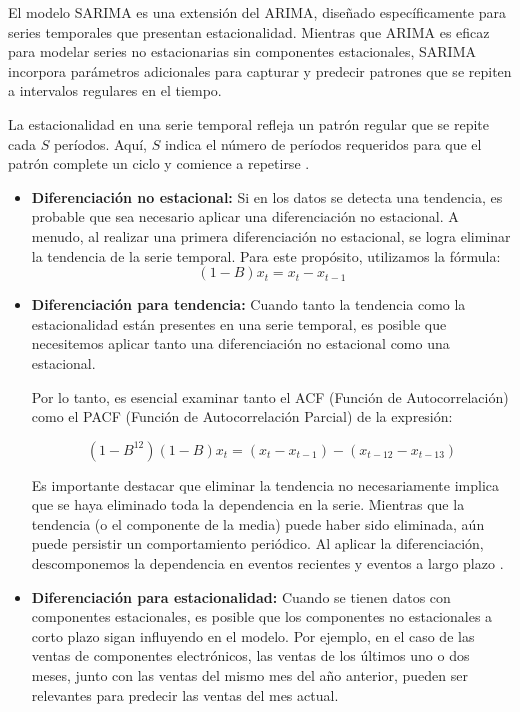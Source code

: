 El modelo SARIMA es una extensión del ARIMA, diseñado específicamente para series temporales que presentan estacionalidad. Mientras que ARIMA es eficaz para modelar series no estacionarias sin componentes estacionales, SARIMA incorpora parámetros adicionales para capturar y predecir patrones que se repiten a intervalos regulares en el tiempo.

La estacionalidad en una serie temporal refleja un patrón regular que se repite cada 
\( S \) períodos. Aquí, \( S \) indica el número de períodos requeridos para que el patrón complete un ciclo y comience a repetirse \cite{series-de-tiempo-sarima}.

\begin{itemize}
    \item \textbf{Diferenciación no estacional:} Si en los datos se detecta una tendencia, es probable que sea necesario aplicar una diferenciación no estacional. A menudo, al realizar una primera diferenciación no estacional, se logra eliminar la tendencia de la serie temporal. Para este propósito, utilizamos la fórmula:
    \begin{equation*}
        (1 - B) x_t = x_t - x_{t-1}
    \end{equation*}
    
    \item \textbf{Diferenciación para tendencia:} Cuando tanto la tendencia como la estacionalidad están presentes en una serie temporal, es posible que necesitemos aplicar tanto una diferenciación no estacional como una estacional.

    Por lo tanto, es esencial examinar tanto el ACF (Función de Autocorrelación) como el PACF (Función de Autocorrelación Parcial) de la expresión:
    
        \begin{equation*}
            (1 - B^{12})(1 - B) x_t = (x_t - x_{t-1}) - (x_{t-12} - x_{t-13})
        \end{equation*}
    
    Es importante destacar que eliminar la tendencia no necesariamente implica que se haya eliminado toda la dependencia en la serie. Mientras que la tendencia (o el componente de la media) puede haber sido eliminada, aún puede persistir un comportamiento periódico. Al aplicar la diferenciación, descomponemos la dependencia en eventos recientes y eventos a largo plazo \cite{series-de-tiempo-sarima}.    
    
    \item \textbf{Diferenciación para estacionalidad:} Cuando se tienen datos con componentes estacionales, es posible que los componentes no estacionales a corto plazo sigan influyendo en el modelo. Por ejemplo, en el caso de las ventas de componentes electrónicos, las ventas de los últimos uno o dos meses, junto con las ventas del mismo mes del año anterior, pueden ser relevantes para predecir las ventas del mes actual.


\end{itemize}
